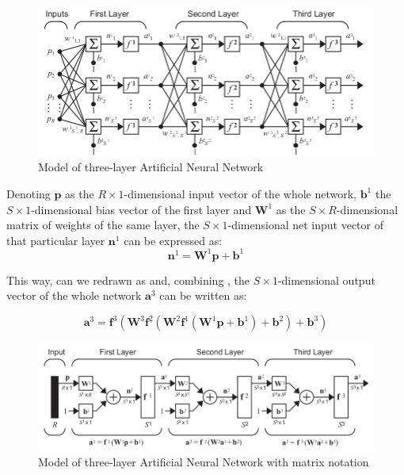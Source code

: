 \begin{figure}[!ht]
\centering
\includegraphics[width=\textwidth]{images/neuralnetworkmodel.png}
\caption{Model of three-layer Artificial Neural Network}
\label{fig:neuralnetworkmodel}
\end{figure}

Denoting
$\mathbf{p}$ as the $R\times 1$-dimensional input vector of the whole network, 
$\mathbf{b}^1$ the $S\times 1$-dimensional bias vector of the first layer and 
$\mathbf{W}^1$ as the $S\times R$-dimensional matrix of weights of the same layer, 
the $S\times 1$-dimensional net input vector of that particular layer $\mathbf{n}^1$ can be expressed as:
\begin{equation} 
\mathbf{n}^1=\mathbf{W}^1\mathbf{p}+\mathbf{b}^1
\label{eq:netinputvector}
\end{equation}

This way,  can we redrawn as  and, combining , the $S\times 1$-dimensional output vector of the whole network 
$\mathbf{a}^3$ can be written as:

\begin{equation}
\mathbf{a}^3=\mathbf{f}^3(\mathbf{W}^3\mathbf{f}^2(\mathbf{W}^2\mathbf{f}^1(\mathbf{W}^1\mathbf{p}+\mathbf{b}^1)+\mathbf{b}^2)+\mathbf{b}^3)
\label{eq:ouputnetworkvector}
\end{equation}

\begin{figure}[!ht]
\centering
\includegraphics[width=\textwidth]{images/neuralnetworkmodelVectorial.png}
\caption{Model of three-layer Artificial Neural Network with matrix notation}
\label{fig:neuralnetworkmodelVectorial}
\end{figure}

